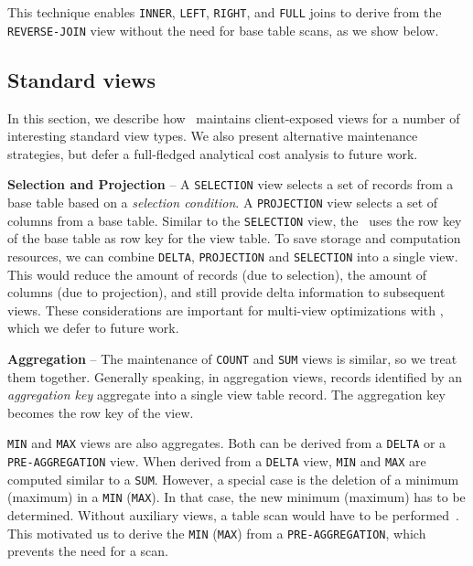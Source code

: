 This technique enables \texttt{INNER}, \texttt{LEFT}, \texttt{RIGHT},
and \texttt{FULL} joins to derive from the \texttt{REVERSE-JOIN} view
without the need for base table scans, as we show below.



\subsection{Standard views}
\label{subsec:common_views}

In this section, we describe how \VMS\ maintains client-exposed views
for a number of interesting standard view types. We also present
alternative maintenance strategies, but defer a full-fledged
analytical cost analysis to future work.

\noindent  
\textbf{Selection and Projection} -- A \texttt{SELECTION} view selects
a set of records from a base table based on a \textit{selection
  condition}. A \texttt{PROJECTION} view selects a set of columns from a base
table. Similar to the \texttt{SELECTION} view, the \VM\ uses the row
key of the base table as row key for the view table. To save storage and 
computation resources, we can combine \texttt{DELTA}, \texttt{PROJECTION} and
\texttt{SELECTION} into a single view. This would reduce the amount of
records (due to selection), the amount of columns (due to projection),
and still provide delta information to subsequent views. These
considerations are important for multi-view optimizations with \VMS,
which we defer to future work.

\noindent  
\textbf{Aggregation} -- The maintenance of \texttt{COUNT} and
\texttt{SUM} views is similar, so we treat them together.
Generally speaking, in aggregation views, records identified by an
\textit{aggregation key} aggregate into a single view table record.
The aggregation key becomes the row key of the view. 

\texttt{MIN} and \texttt{MAX} views are
also aggregates. Both can be derived from a \texttt{DELTA} or a
\texttt{PRE-AGGREGATION} view. When derived from a \texttt{DELTA}
view, \texttt{MIN} and \texttt{MAX} are computed similar to a
\texttt{SUM}. However, a special case is the deletion of a minimum
(maximum) in a \texttt{MIN} (\texttt{MAX}). In that case, the new
minimum (maximum) has to be determined. Without auxiliary views, a
table scan would have to be
performed~\cite{jacobsen:viewmaintenance}. This motivated us to derive
the \texttt{MIN} (\texttt{MAX}) from a \texttt{PRE-AGGREGATION}, which
prevents the need for a scan.

